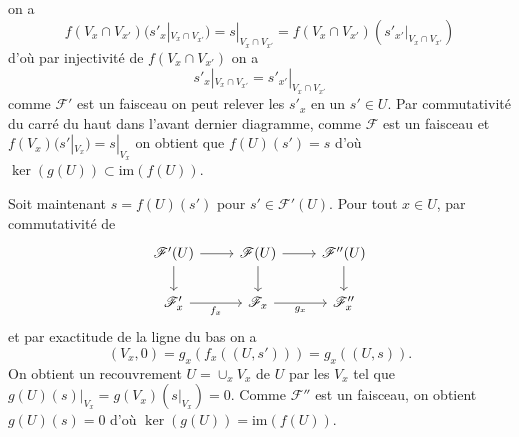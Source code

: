 \documentclass[a4paper,12pt]{article}
\newcommand{\F}{\mathscr F}
\newcommand{\im}{\textrm{im}}
\theoremstyle{plain}
\theoremstyle{definition}
\theoremstyle{remark}
\begin{document}
on a 
\[f(V_x\cap V_{x'})(s'_x|_{V_x\cap V_{x'}})=s|_{V_x\cap V_{x'}}=
f(V_x\cap V_{x'})(s'_{x'}|_{V_x\cap V_{x'}})\]
d'où par injectivité de $f(V_x\cap V_{x'})$ on a 
\[s'_x|_{V_x\cap V_{x'}}=s'_{x'}|_{V_x\cap V_{x'}}\]
comme $\F'$ est un faisceau on peut relever les $s'_x$ en un $s'\in U$.
Par commutativité du carré du haut dans l'avant dernier diagramme, comme
$\F$ est un faisceau et $f(V_x)(s'|_{V_x})=s|_{V_x}$ on obtient que
$f(U)(s')=s$ d'où $\ker(g(U))\subset \im(f(U))$. 

Soit maintenant $s=f(U)(s')$ pour $s'\in \F'(U)$. Pour tout $x\in U$,
par commutativité de 
\[\begin{tikzcd}
	{\F'(U)} & {\F(U)} & {\F''(U)} \\
	{\F'_x} & {\F_x} & {\F''_x}
	\arrow[from=1-1, to=1-2]
	\arrow[from=1-1, to=2-1]
	\arrow[from=1-2, to=1-3]
	\arrow[from=1-2, to=2-2]
	\arrow[from=1-3, to=2-3]
	\arrow["{f_x}"', from=2-1, to=2-2]
	\arrow["{g_x}"', from=2-2, to=2-3]
\end{tikzcd}\]
et par exactitude de la ligne du bas on a 
\[(V_x,0)=g_x(f_x((U,s')))=g_x((U,s)).\]
On obtient un recouvrement 
$U=\cup_x V_x$ de $U$ par les $V_x$ tel que 
$g(U)(s)|_{V_x}=g(V_x)(s|_{V_x})=0$.
Comme $\F''$ est un faisceau, on obtient $g(U)(s)=0$ d'où 
$\ker(g(U))=\im(f(U))$.
\end{document}
